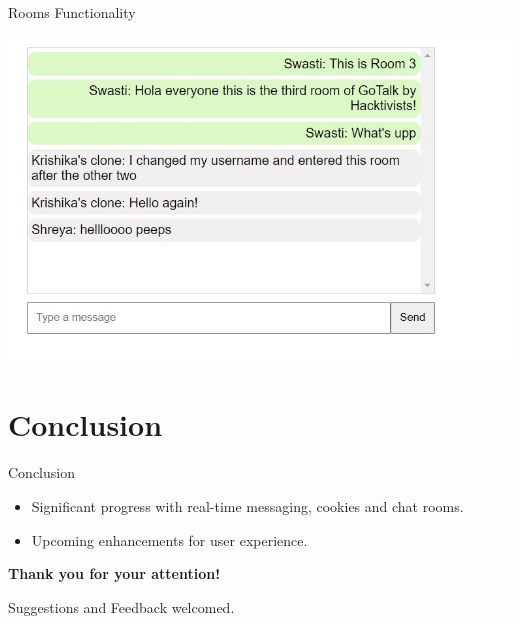\documentclass{beamer}
\begin{document}
\begin{frame}{Rooms Functionality}
\begin{minipage}[t]{0.3\textwidth}
            \includegraphics[width=\textwidth]{Pictures/room3.jpg}
        \end{minipage}
\end{frame}


\section{Conclusion}

\begin{frame}{Conclusion}
    \begin{itemize}
        \item Significant progress with real-time messaging, cookies and chat rooms.
        \item Upcoming enhancements for user experience.
    \end{itemize}
    \vfill
    \begin{center}
        \textbf{Thank you for your attention!}
    \end{center}
    \begin{center}
        Suggestions and Feedback welcomed.
    \end{center}
\end{frame}
\end{document}
